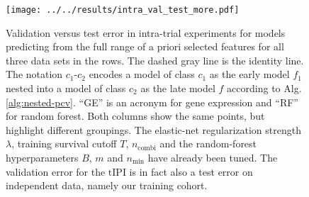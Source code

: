 \begin{figure}
    \centering
    \texttt{[image: ../../results/intra\_val\_test\_more.pdf]}
    \caption{Validation versus test error in intra-trial experiments for models predicting from the 
        full range of a priori selected features for all three data sets in the rows. The dashed 
        gray line is the identity line. The notation 
        $c_1$-$c_2$ encodes a model of class $c_1$ as the early model $f_1$ nested into a model of 
        class $c_2$ as the late model $f$ according to Alg. \ref{alg:nested-pcv}.
        ``GE'' is an acronym for gene expression and ``RF'' for random forest. Both columns show 
        the same points, but highlight different groupings. The elastic-net 
        regularization strength $\lambda$, training survival cutoff $T$, $n_\text{combi}$ and the 
        random-forest hyperparameters $B$, $m$ and $n_\text{min}$ have already been tuned. The 
        validation error for the $\text{tIPI}$ is in fact also a test error on independent data, 
        namely our training cohort.}
    \label{fig:intra-val-test-more}
\end{figure}